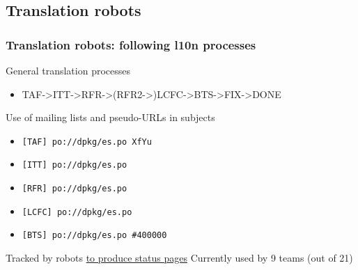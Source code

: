 \documentclass{beamer}
\begin{document}

%
%

\subsection{Translation robots}

\begin{frame}
  \frametitle{Translation robots: following l10n processes}
	\begin{block}
		{General translation processes}
		\begin{itemize}
		\item
			{TAF->ITT->RFR->(RFR2->)LCFC->BTS->FIX->DONE}
		\end{itemize}
	\end{block}
	\begin{block}
		{Use of mailing lists and pseudo-URLs in subjects}
		\begin{itemize}
		\item
			{\texttt{[TAF] po://dpkg/es.po XfYu}}
		\item
			{\texttt{[ITT] po://dpkg/es.po}}
		\item
			{\texttt{[RFR] po://dpkg/es.po}}
		\item
			{\texttt{[LCFC] po://dpkg/es.po}}
		\item
			{\texttt{[BTS] po://dpkg/es.po \#400000}}
		\end{itemize}
	\end{block}
	\begin{block}
		{Tracked by robots \href{http://http://www.debian.org.es/cgi-bin/l10n.cgi?team=es}{to produce status pages}}
		Currently used by 9 teams (out of 21)
	\end{block}
\end{frame}
\end{document}
